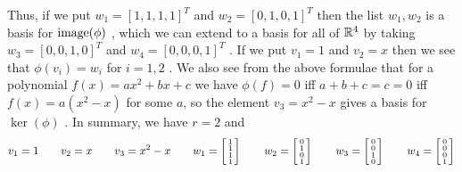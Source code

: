 \documentclass[a4paper]{article}
\begin{document}
\begin{solution}
\begin{itemize}
\[   \]
   Thus, if we put $w_1=[1,1,1,1]^T$ and $w_2=[0,1,0,1]^T$ then
   the list $w_1,w_2$ is a basis for $\operatorname{image}(\phi)$ , which we can extend
   to a basis for all of ${\mathbb{R}}^4$ by taking $w_3=[0,0,1,0]^T$ and
   $w_4=[0,0,0,1]^T$ .  If we put $v_1=1$ and $v_2=x$ then we see that
   $\phi(v_i)=w_i$ for $i=1,2$ .  We also see from the above formulae
   that for a polynomial $f(x)=ax^2+bx+c$ we have $\phi(f)=0$ iff
   $a+b+c=c=0$ iff $f(x)=a(x^2-x)$ for some $a$, so the element
   $v_3=x^2-x$ gives a basis for $\ker(\phi)$ .  In summary, we have
   $r=2$ and
   \[ v_1=1 \hspace{2em}
      v_2=x \hspace{2em}
      v_3=x^2-x \hspace{2em}
      w_1=\left[\begin{smallmatrix} 1\\1\\1\\1\end{smallmatrix}\right] \hspace{2em}
      w_2=\left[\begin{smallmatrix} 0\\1\\0\\1\end{smallmatrix}\right] \hspace{2em}
      w_3=\left[\begin{smallmatrix} 0\\0\\1\\0\end{smallmatrix}\right] \hspace{2em}
      w_4=\left[\begin{smallmatrix} 0\\0\\0\\1\end{smallmatrix}\right]
   \]
 \end{itemize}
\end{solution}
\end{document}
